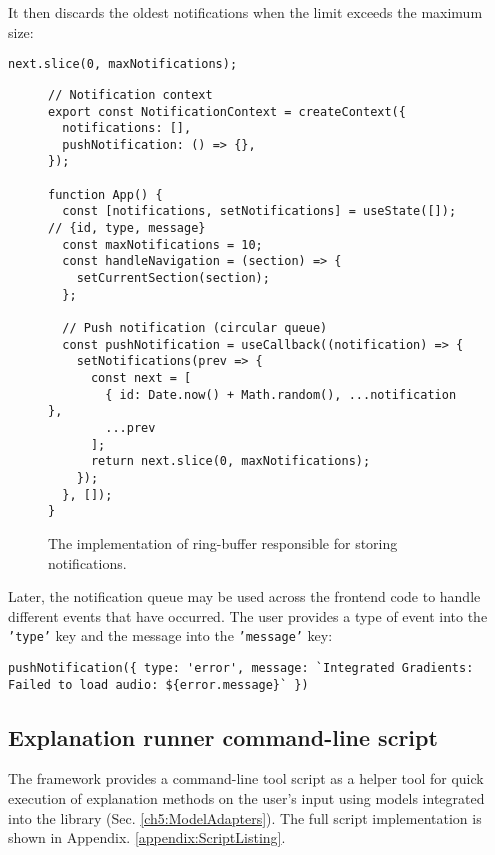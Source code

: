 \documentclass[
    bindingoffset=5mm,  %
    footnoteindent=3mm, %
    hyphenation=true    %
]{src/wut-thesis}
\begin{document}
It then discards the oldest notifications when the limit exceeds the maximum size:
\begin{verbatim}
next.slice(0, maxNotifications);
\end{verbatim}

\begin{figure}%
\begin{verbatim}
// Notification context
export const NotificationContext = createContext({
  notifications: [],
  pushNotification: () => {},
});

function App() {
  const [notifications, setNotifications] = useState([]); // {id, type, message}
  const maxNotifications = 10;
  const handleNavigation = (section) => {
    setCurrentSection(section);
  };

  // Push notification (circular queue)
  const pushNotification = useCallback((notification) => {
    setNotifications(prev => {
      const next = [
        { id: Date.now() + Math.random(), ...notification },
        ...prev
      ];
      return next.slice(0, maxNotifications);
    });
  }, []);
}
\end{verbatim}
\caption{The implementation of ring-buffer responsible for storing notifications.}
\label{fig:NotificationImpl}
\end{figure}

Later, the notification queue may be used across the frontend code to handle different
events that have occurred. The user provides a type of event into the \texttt{'type'} key and
the message into the \texttt{'message'} key:
\begin{verbatim}
pushNotification({ type: 'error', message: `Integrated Gradients: Failed to load audio: ${error.message}` })
\end{verbatim}

\clearpage %
\subsection{Explanation runner command-line script}

The framework provides a command-line tool script as a helper tool for quick execution
of explanation methods on the user’s input using models integrated into the library
(Sec. \ref{ch5:ModelAdapters}). The full script implementation
is shown in Appendix. \ref{appendix:ScriptListing}.
\end{document}
